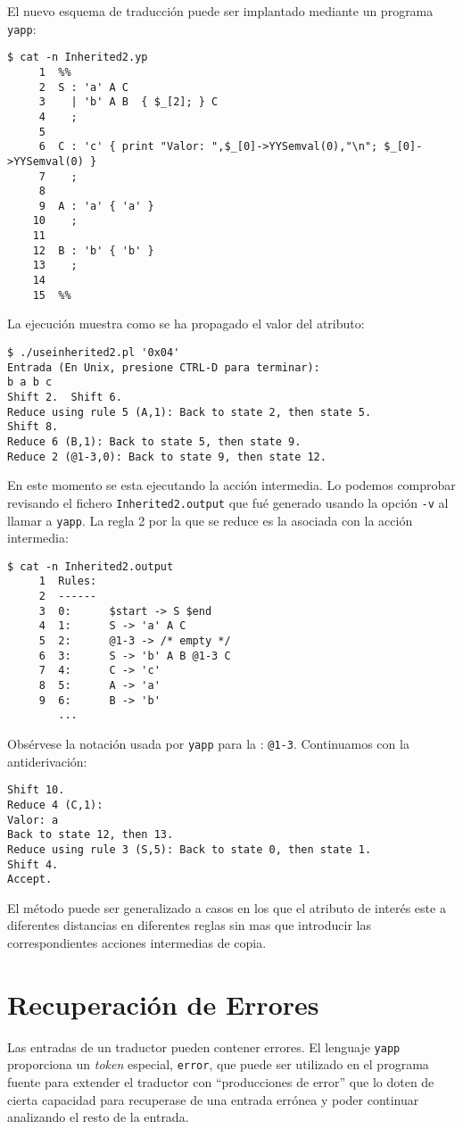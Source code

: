 El nuevo esquema de traducción puede ser implantado mediante
un programa \verb|yapp|:

\begin{verbatim}
$ cat -n Inherited2.yp
     1  %%
     2  S : 'a' A C
     3    | 'b' A B  { $_[2]; } C
     4    ;
     5
     6  C : 'c' { print "Valor: ",$_[0]->YYSemval(0),"\n"; $_[0]->YYSemval(0) }
     7    ;
     8
     9  A : 'a' { 'a' }
    10    ;
    11
    12  B : 'b' { 'b' }
    13    ;
    14
    15  %%
\end{verbatim}

La ejecución muestra como se ha propagado el valor del atributo:
\begin{verbatim}
$ ./useinherited2.pl '0x04'
Entrada (En Unix, presione CTRL-D para terminar):
b a b c
Shift 2.  Shift 6.
Reduce using rule 5 (A,1): Back to state 2, then state 5.
Shift 8.
Reduce 6 (B,1): Back to state 5, then state 9.
Reduce 2 (@1-3,0): Back to state 9, then state 12.
\end{verbatim}

En este momento se esta ejecutando la acción intermedia.
Lo podemos comprobar revisando el fichero \verb|Inherited2.output|
que fué generado usando la opción \verb|-v| al llamar a \verb|yapp|.
La regla 2 por la que se reduce es la asociada con la acción 
intermedia:

\begin{verbatim}
$ cat -n Inherited2.output
     1  Rules:
     2  ------
     3  0:      $start -> S $end
     4  1:      S -> 'a' A C
     5  2:      @1-3 -> /* empty */
     6  3:      S -> 'b' A B @1-3 C
     7  4:      C -> 'c'
     8  5:      A -> 'a'
     9  6:      B -> 'b'
        ...
\end{verbatim}

Obsérvese la notación usada por \verb|yapp| para la 
: \verb|@1-3|.
Continuamos con la antiderivación:

\begin{verbatim}
Shift 10.
Reduce 4 (C,1): 
Valor: a
Back to state 12, then 13.
Reduce using rule 3 (S,5): Back to state 0, then state 1.
Shift 4.
Accept.
\end{verbatim}

El método puede ser generalizado a casos en los
que el atributo de interés este a diferentes distancias en
diferentes reglas sin mas que introducir las correspondientes
acciones intermedias de copia.

\section{Recuperación de Errores}
\label{section:errores}
Las entradas de un traductor pueden contener errores. 
El lenguaje \verb|yapp| proporciona un \emph{token} especial,
\verb|error|, que puede ser utilizado en el programa fuente
para extender el traductor con ``producciones de error'' 
que lo doten de cierta capacidad para 
recuperase de  una entrada errónea y poder continuar 
analizando el resto de la entrada.


